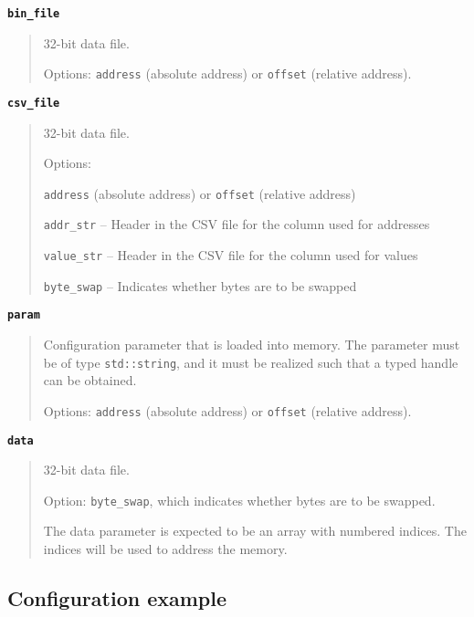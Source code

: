 {\textbf {\footnotesize{\lstinline!bin_file!}}}
\vspace{-2pt}
\begin{quote}
32-bit data file.

Options: {\small{\lstinline!address!}} (absolute address) or {\small{\lstinline!offset!}} (relative address).
\end{quote}


{\textbf {\footnotesize{\lstinline!csv_file!}}}
\vspace{-2pt}
\begin{quote}
32-bit data file.

Options:
\begin{itemize1}
\item {\small{\lstinline!address!}} (absolute address) or {\small{\lstinline!offset!}} (relative address)
\item {\small{\lstinline!addr_str!}}  -- Header in the CSV file for the column used for addresses
\item {\small{\lstinline!value_str!}} -- Header in the CSV file for the column used for values
\item {\small{\lstinline!byte_swap!}} -- Indicates whether bytes are to be swapped
\end{itemize1}
\end{quote}


{\textbf {\footnotesize{\lstinline!param!}}}
\vspace{-2pt}
\begin{quote}
Configuration parameter that is loaded into memory. The parameter must be of type {\small{\lstinline!std::string!}}, and it must be realized such that a typed handle can be obtained.

Options: {\small{\lstinline!address!}} (absolute address) or {\small{\lstinline!offset!}} (relative address).
\end{quote}


{\textbf {\footnotesize{\lstinline!data!}}}
\vspace{-2pt}
\begin{quote}
32-bit data file.

Option: {\small{\lstinline!byte_swap!}}, which indicates whether bytes are to be swapped.

The data parameter is expected to be an array with numbered indices. The indices will be used to address the memory.
\end{quote}


\subsection{Configuration example}


